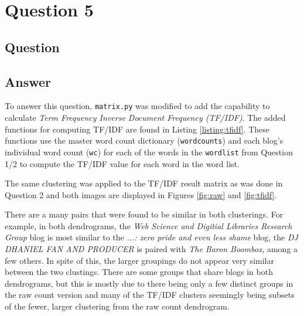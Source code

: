 \section{Question 5}

\subsection{Question}


\subsection{Answer}

To answer this question, {\tt matrix.py} was modified to add the capability to calculate {\it Term Frequency Inverse Document Frequency (TF/IDF)}. The added functions for computing TF/IDF are found in Listing \ref{listing:tfidf}. These functions use the master word count dictionary ({\tt wordcounts}) and each blog's individual word count ({\tt wc}) for each of the words in the {\tt wordlist} from Question 1/2 to compute the TF/IDF value for each word in the word list. 







The same clustering was applied to the TF/IDF result matrix as was done in Question 2 and both images are displayed in Figures \ref{fig:raw} and \ref{fig:tfidf}.

There are a many pairs that were found to be similar in both clusterings. For example, in both dendrograms, the {\it Web Science and Digitial Libraries Research Group} blog is most similar to the {\it ...: zero pride and even less shame} blog, the {\it DJ DHANIEL FAN AND PRODUCER} is paired with {\it The Baron Boombox}, among a few others. In spite of this, the larger groupings do not appear very similar between the two clustings. There are some groups that share blogs in both dendrograms, but this is mostly due to there being only a few distinct groups in the raw count version and many of the TF/IDF clusters seemingly being subsets of the fewer, larger clustering from the raw count dendrogram.

